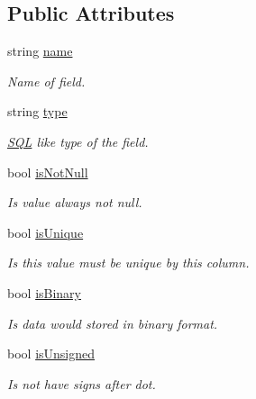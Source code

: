 \subsection*{Public Attributes}
\begin{DoxyCompactItemize}
\item 
string \mbox{\hyperlink{struct_uniform_data_operator_1_1_s_q_l_1_1_tables_1_1_table_column_meta_a45446064367c10698f81576012c5af56}{name}}
\begin{DoxyCompactList}\small\item\em Name of field. \end{DoxyCompactList}\item 
string \mbox{\hyperlink{struct_uniform_data_operator_1_1_s_q_l_1_1_tables_1_1_table_column_meta_a28f7e1b419d55df48eb3627c37d69b07}{type}}
\begin{DoxyCompactList}\small\item\em \mbox{\hyperlink{namespace_uniform_data_operator_1_1_s_q_l}{S\+QL}} like type of the field. \end{DoxyCompactList}\item 
bool \mbox{\hyperlink{struct_uniform_data_operator_1_1_s_q_l_1_1_tables_1_1_table_column_meta_a248a0650ed2f1c11ebad71478e624131}{is\+Not\+Null}}
\begin{DoxyCompactList}\small\item\em Is value always not null. \end{DoxyCompactList}\item 
bool \mbox{\hyperlink{struct_uniform_data_operator_1_1_s_q_l_1_1_tables_1_1_table_column_meta_a661feecc5876fbabda334122fd9c940b}{is\+Unique}}
\begin{DoxyCompactList}\small\item\em Is this value must be unique by this column. \end{DoxyCompactList}\item 
bool \mbox{\hyperlink{struct_uniform_data_operator_1_1_s_q_l_1_1_tables_1_1_table_column_meta_ad13d6009030869b890d76e20266f8e59}{is\+Binary}}
\begin{DoxyCompactList}\small\item\em Is data would stored in binary format. \end{DoxyCompactList}\item 
bool \mbox{\hyperlink{struct_uniform_data_operator_1_1_s_q_l_1_1_tables_1_1_table_column_meta_a910f4023fa20c7f484150bd2a27d2488}{is\+Unsigned}}
\begin{DoxyCompactList}\small\item\em Is not have signs after dot. \end{DoxyCompactList}\item 

\end{DoxyCompactItemize}
